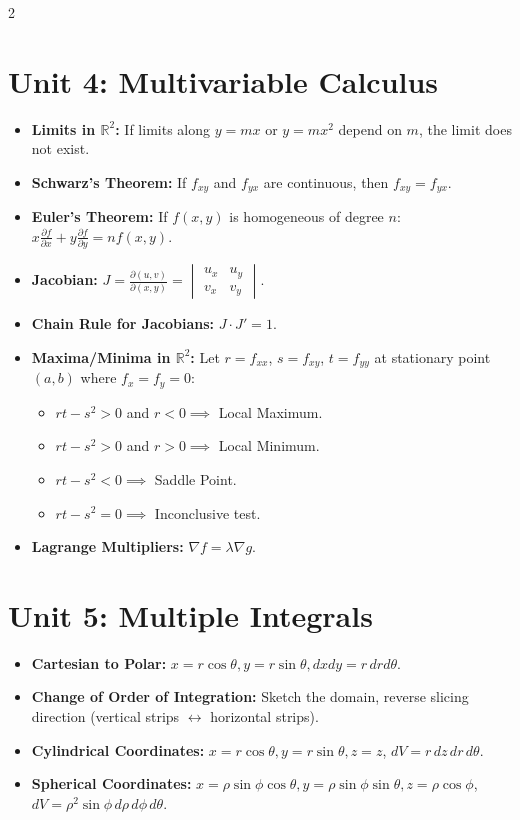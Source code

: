 \begin{multicols}{2}
{\columnbreak

\section*{Unit 4: Multivariable Calculus}
\begin{itemize}[leftmargin=*]
    \item \textbf{Limits in $\mathbb{R}^2$:} If limits along $y = mx$ or $y = mx^2$ depend on $m$, the limit does not exist.
    \item \textbf{Schwarz's Theorem:} If $f_{xy}$ and $f_{yx}$ are continuous, then $f_{xy} = f_{yx}$.
    \item \textbf{Euler's Theorem:} If $f(x,y)$ is homogeneous of degree $n$:
    $x \frac{\partial f}{\partial x} + y \frac{\partial f}{\partial y} = n f(x,y)$.
    \item \textbf{Jacobian:} $J = \frac{\partial(u,v)}{\partial(x,y)} = \begin{vmatrix} u_x & u_y \\ v_x & v_y \end{vmatrix}$.
    \item \textbf{Chain Rule for Jacobians:} $J \cdot J' = 1$.
    \item \textbf{Maxima/Minima in $\mathbb{R}^2$:}
    Let $r = f_{xx}$, $s = f_{xy}$, $t = f_{yy}$ at stationary point $(a,b)$ where $f_x = f_y = 0$:
    \begin{itemize}
        \item $rt - s^2 > 0$ and $r < 0 \implies$ Local Maximum.
        \item $rt - s^2 > 0$ and $r > 0 \implies$ Local Minimum.
        \item $rt - s^2 < 0 \implies$ Saddle Point.
        \item $rt - s^2 = 0 \implies$ Inconclusive test.
    \end{itemize}
    \item \textbf{Lagrange Multipliers:} $\nabla f = \lambda \nabla g$.
\end{itemize}

\section*{Unit 5: Multiple Integrals}
\begin{itemize}[leftmargin=*]
    \item \textbf{Cartesian to Polar:} $x = r\cos\theta, y = r\sin\theta, dx dy = r \, dr d\theta$.
    \item \textbf{Change of Order of Integration:}
    Sketch the domain, reverse slicing direction (vertical strips $\leftrightarrow$ horizontal strips).
    \item \textbf{Cylindrical Coordinates:} $x = r\cos\theta, y = r\sin\theta, z = z$, $dV = r\,dz\,dr\,d\theta$.
    \item \textbf{Spherical Coordinates:}
    $x = \rho\sin\phi\cos\theta, y = \rho\sin\phi\sin\theta, z = \rho\cos\phi$,
    $dV = \rho^2 \sin\phi \, d\rho\,d\phi\,d\theta$.
\end{itemize}

}
\end{multicols}
